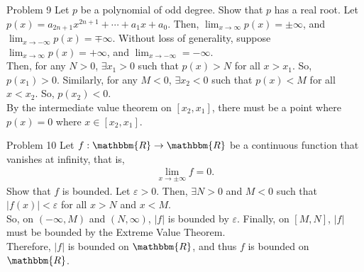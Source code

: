 \documentclass[8pt]{extarticle}
\newcommand{\R}{\mathbbm{R}}
\begin{document}
  \begin{problem}{Problem 9}
    Let $p$ be a polynomial of odd degree. Show that $p$ has a real root.
    \tcblower
    Let $p(x) = a_{2n+1}x^{2n+1} + \cdots + a_{1}x + a_0$. Then, $\lim_{x\rightarrow\infty}p(x) = \pm \infty$, and $\lim_{x\rightarrow -\infty} p(x) = \mp \infty$. Without loss of generality, suppose $\lim_{x\rightarrow\infty}p(x) = +\infty$, and $\lim_{x\rightarrow-\infty} = -\infty$.\\

    Then, for any $N > 0$, $\exists x_1 > 0$ such that $p(x) > N$ for all $x > x_1$. So, $p(x_1) > 0$. Similarly, for any $M < 0$, $\exists x_2 < 0$ such that $p(x) < M$ for all $x < x_2$. So, $p(x_2) < 0$.\\

    By the intermediate value theorem on $[x_2,x_1]$, there must be a point where $p(x) = 0$ where $x\in [x_2,x_1]$.
  \end{problem}
  \begin{problem}{Problem 10}
    Let $f: \R\rightarrow \R$ be a continuous function that vanishes at infinity, that is,
    \begin{align*}
      \lim_{x\rightarrow \pm\infty}f = 0.
    \end{align*}
    Show that $f$ is bounded.
    \tcblower
    Let $\varepsilon > 0$. Then, $\exists N > 0$ and $M < 0$ such that $|f(x)| < \varepsilon$ for all $x > N$ and $x < M$.\\

    So, on $(-\infty,M)$ and $(N,\infty)$, $|f|$ is bounded by $\varepsilon$. Finally, on $[M,N]$, $|f|$ must be bounded by the Extreme Value Theorem.\\

    Therefore, $|f|$ is bounded on $\R$, and thus $f$ is bounded on $\R$.
  \end{problem}
\end{document}
